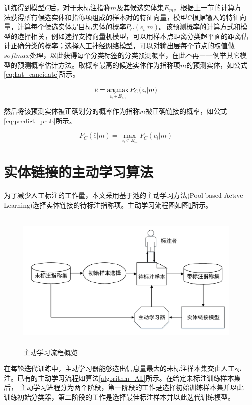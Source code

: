 训练得到模型$C$后，对于未标注指称$m$及其候选实体集$E_m$，根据上一节的计算方法获得所有候选实体和指称项组成的样本对的特征向量，模型$C$根据输入的特征向量，计算每个候选实体是目标实体的概率$P_C(e_i|m)$。该预测概率的计算方式和模型的选择相关，例如选择支持向量机模型，可以用样本点距离分类超平面的距离估计正确分类的概率\cite{李航2012统计学习方法}；选择人工神经网络模型，可以对输出层每个节点的权值做$softmax$处理，以此获得每个分类标签的分类预测概率\cite{ravuri2016comparative}，在此不再一一例举其它模型的预测概率估计方法。取概率最高的候选实体作为指称项$m$的预测实体，如公式\ref{eq:hat_cancidate}所示。

\begin{equation}\label{eq:hat_cancidate}
\hat{e}=\operatorname*{argmax}_{e_i\in E_m} P_C(e_i|m)
\end{equation}

然后将该预测实体被正确划分的概率作为指称$m$被正确链接的概率，如公式\ref{eq:predict_prob}所示。

\begin{equation}\label{eq:predict_prob}
P_C(\hat{e}|m)=\max_{e_i\in E_m}P_C(e_i|m)
\end{equation}

\section{实体链接的主动学习算法}
为了减少人工标注的工作量，本文采用基于池的主动学习方法(Pool-based Active Learning)选择实体链接的待标注指称项。主动学习流程图如图\ref{fig:al_overview}所示。

\begin{figure}[!htb]
	\centering\includegraphics[height=7cm]{resource/al_overview}
	\caption{主动学习流程概览}
	\label{fig:al_overview}
\end{figure}

在每轮迭代训练中，主动学习器能够选出信息量最大的未标注样本集交由人工标注。已有的主动学习\cite{settles2012active}流程如算法\ref{algorithm_AL}所示。在给定未标注训练样本集后， 主动学习进程分为两个阶段，第一阶段的工作是选择初始训练样本集并以此训练初始分类器，第二阶段的工作是选择最佳标注样本并以此迭代训练模型。


